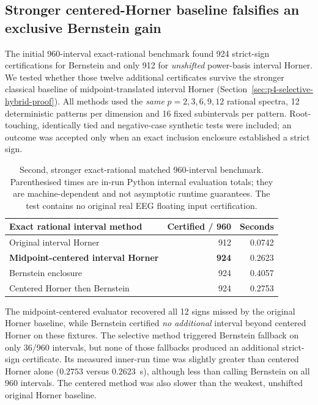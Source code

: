 \subsection{Stronger centered-Horner baseline falsifies an exclusive Bernstein gain}
\label{sec:p4-strong-centered-control}
The initial 960-interval exact-rational benchmark
found 924 strict-sign certifications for Bernstein
and only 912 for \emph{unshifted} power-basis
interval Horner. We tested whether those
twelve additional certificates survive the
stronger classical baseline of
midpoint-translated interval Horner
(Section~\ref{sec:p4-selective-hybrid-proof}).
All methods used the \emph{same}
$p=2,3,6,9,12$ rational spectra,
12 deterministic patterns per dimension
and 16 fixed subintervals per pattern.
Root-touching, identically tied and
negative-case synthetic tests were
included; an outcome was accepted only
when an exact inclusion enclosure
established a strict sign.

\begin{table}[tb]
\centering\small
\caption{Second, stronger exact-rational matched
960-interval benchmark. Parenthesised times
are in-run Python internal evaluation totals;
they are machine-dependent and not asymptotic
runtime guarantees. The test contains no
original real EEG floating input certification.}
\label{tab:p4-centered-horner}
\setlength{\tabcolsep}{4pt}
\begin{tabular}{lrr}
\toprule
Exact rational interval method & Certified / 960 & Seconds\\
\midrule
Original interval Horner & 912 & 0.0742\\
\textbf{Midpoint-centered interval Horner} & \textbf{924} & 0.2623\\
Bernstein enclosure & 924 & 0.4057\\
Centered Horner then Bernstein & 924 & 0.2753\\
\bottomrule
\end{tabular}
\end{table}

The midpoint-centered evaluator recovered all
12 signs missed by the original Horner baseline,
while Bernstein certified \emph{no additional}
interval beyond centered Horner on these
fixtures. The selective method triggered
Bernstein fallback on only 36/960 intervals,
but none of those fallbacks produced an
additional strict-sign certificate.
Its measured inner-run time was slightly
greater than centered Horner alone
($0.2753$ versus $0.2623$~s),
although less than calling Bernstein on
all 960 intervals. The centered method
was also slower than the weakest,
unshifted original Horner baseline.

